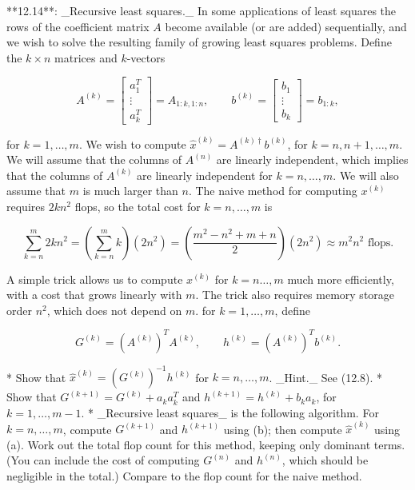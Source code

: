 

**12.14**: _Recursive least squares._ In some applications of least squares the rows of the coefficient matrix \(A\) become available (or are added) sequentially, and we wish to solve the resulting family of growing least squares problems. Define the \(k\times n\) matrices and \(k\)-vectors

\[A^{(k)}=\left[\begin{array}{c}a_{1}^{T}\\ \vdots\\ a_{k}^{T}\end{array}\right]=A_{1:k,1:n},\qquad b^{(k)}=\left[\begin{array}{c }b_{1}\\ \vdots\\ b_{k}\end{array}\right]=b_{1:k},\]

for \(k=1,\ldots,m\). We wish to compute \(\hat{x}^{(k)}=A^{(k)\dagger}b^{(k)}\), for \(k=n,n+1,\ldots,m\). We will assume that the columns of \(A^{(n)}\) are linearly independent, which implies that the columns of \(A^{(k)}\) are linearly independent for \(k=n,\ldots,m\). We will also assume that \(m\) is much larger than \(n\). The naive method for computing \(x^{(k)}\) requires \(2kn^{2}\) flops, so the total cost for \(k=n,\ldots,m\) is

\[\sum_{k=n}^{m}2kn^{2}=\left(\sum_{k=n}^{m}k\right)(2n^{2})=\left(\frac{m^{2}- n^{2}+m+n}{2}\right)(2n^{2})\approx m^{2}n^{2}\text{ flops}.\]

A simple trick allows us to compute \(x^{(k)}\) for \(k=n\ldots,m\) much more efficiently, with a cost that grows linearly with \(m\). The trick also requires memory storage order \(n^{2}\), which does not depend on \(m\). for \(k=1,\ldots,m\), define

\[G^{(k)}=(A^{(k)})^{T}A^{(k)},\qquad h^{(k)}=(A^{(k)})^{T}b^{(k)}.\]

* Show that \(\hat{x}^{(k)}=(G^{(k)})^{-1}h^{(k)}\) for \(k=n,\ldots,m\). _Hint._ See (12.8).
* Show that \(G^{(k+1)}=G^{(k)}+a_{k}a_{k}^{T}\) and \(h^{(k+1)}=h^{(k)}+b_{k}a_{k}\), for \(k=1,\ldots,m-1\).
* _Recursive least squares_ is the following algorithm. For \(k=n,\ldots,m\), compute \(G^{(k+1)}\) and \(h^{(k+1)}\) using (b); then compute \(\hat{x}^{(k)}\) using (a). Work out the total flop count for this method, keeping only dominant terms. (You can include the cost of computing \(G^{(n)}\) and \(h^{(n)}\), which should be negligible in the total.) Compare to the flop count for the naive method.

